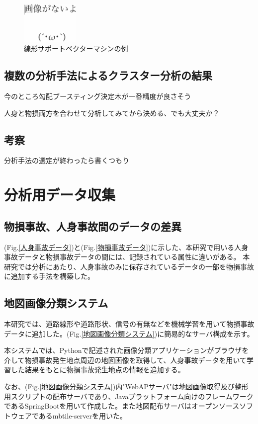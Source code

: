 \documentclass[a4j,8.5pt, twocolumn,fleqn]{jbook}
\begin{document}
\begin{figure}[htb]
\centering
\includegraphics[height=20mm]{images/no_image.eps}
\caption{線形サポートベクターマシンの例}
\label{classifications}
\end{figure}

\subsection{複数の分析手法によるクラスター分析の結果}
今のところ勾配ブースティング決定木が一番精度が良さそう

人身と物損両方を合わせて分析してみてから決める、でも大丈夫か？

\subsection{考察}
分析手法の選定が終わったら書くつもり

\section{分析用データ収集}
\subsection{物損事故、人身事故間のデータの差異}
(Fig.\ref{人身事故データ})と(Fig.\ref{物損事故データ})に示した、本研究で用いる人身事故データと物損事故データの間には、記録されている属性に違いがある。
本研究では分析にあたり、人身事故のみに保存されているデータの一部を物損事故に追加する手法を構築した。

\subsection{地図画像分類システム}
本研究では、道路線形や道路形状、信号の有無などを機械学習を用いて物損事故データに追加した。(Fig.\ref{地図画像分類システム})に簡易的なサーバ構成を示す。

本システムでは、Pythonで記述された画像分類アプリケーションがブラウザを介して物損事故発生地点周辺の地図画像を取得して、人身事故データを用いて学習した結果をもとに物損事故発生地点の情報を追加する。

なお、(Fig.\ref{地図画像分類システム})内"WebAPサーバ"は地図画像取得及び整形用スクリプトの配布サーバであり、Javaプラットフォーム向けのフレームワークであるSpringBoot\cite{literature3}を用いて作成した。また地図配布サーバはオープンソースソフトウェアであるmbtile-server\cite{literature4}を用いた。
\end{document}
